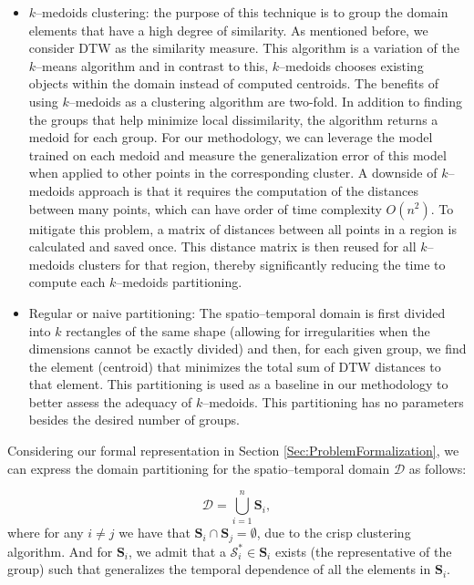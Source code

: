 \begin{itemize}%
	\item $k$--medoids clustering: the purpose of this technique is to group the domain elements that have a high degree of similarity. As mentioned before, we consider DTW as the similarity measure. This algorithm is a variation of the $k$--means algorithm and in contrast to this, $k$--medoids chooses existing objects within the domain instead of computed centroids. The benefits of using $k$--medoids as a clustering algorithm are two-fold. In addition to finding the groups that help minimize local dissimilarity, the algorithm returns a medoid for each group. For our methodology, we can leverage the model trained on each medoid and measure the generalization error of this model when applied to other points in the corresponding cluster. A downside of $k$--medoids approach is that it requires the computation of the distances between many points, which can have order of time complexity $O(n^2)$. To mitigate this problem, a matrix of distances between all points in a region is calculated and saved once. This distance matrix is then reused for all $k$--medoids clusters for that region, thereby significantly reducing the time to compute each $k$--medoids partitioning. 
	
	\item Regular or naive partitioning: The spatio--temporal domain is first divided into $k$ rectangles of the same shape (allowing for irregularities when the dimensions cannot be exactly divided) and then, for each given group, we find the element (centroid) that minimizes the total sum of DTW distances to that element. This partitioning is used as a baseline in our methodology to better assess the adequacy of $k$--medoids. This partitioning has no parameters besides the desired number of groups.
\end{itemize}

Considering our formal representation in Section \ref{Sec:ProblemFormalization}, we can express the domain partitioning for the spatio--temporal domain $\mathcal{D}$ as follows:

\begin{equation}
\mathcal{D} = \bigcup_{i=1}^{n} \mathbf{S}_{i},
\end{equation}
where for any $i\neq j$ we have that $\mathbf{S}_{i} \cap \mathbf{S}_{j} = \emptyset$, due to the crisp clustering algorithm. And for $\mathbf{S}_{i}$, we admit that a $\mathcal{S}_{i}^{*} \in \mathbf{S}_{i}$ exists (the representative of the group) such that generalizes the temporal dependence of all the elements in $\mathbf{S}_{i}$. 

